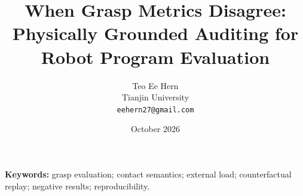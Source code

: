 \documentclass[10pt]{article}
\title{When Grasp Metrics Disagree:\\Physically Grounded Auditing for\\Robot Program Evaluation}
\author{Teo Ee Hern\\Tianjin University\\\texttt{eehern27@gmail.com}}
\date{October 2026}
\begin{document}
\maketitle
\begin{abstract}

\end{abstract}
\noindent\textbf{Keywords:} grasp evaluation; contact semantics; external load; counterfactual replay; negative results; reproducibility.






\FloatBarrier


\clearpage
\appendix

\end{document}
